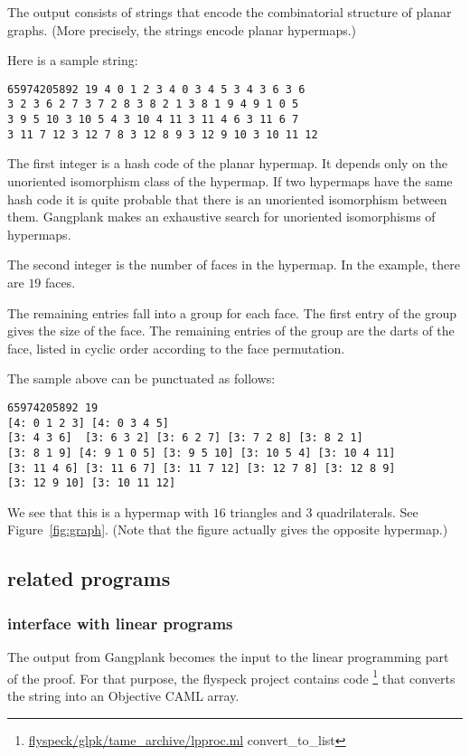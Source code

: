 The output consists of strings that encode the combinatorial structure of planar graphs.  (More precisely, the strings encode planar hypermaps.)

Here is a sample string:
\begin{verbatim}
65974205892 19 4 0 1 2 3 4 0 3 4 5 3 4 3 6 3 6 
3 2 3 6 2 7 3 7 2 8 3 8 2 1 3 8 1 9 4 9 1 0 5 
3 9 5 10 3 10 5 4 3 10 4 11 3 11 4 6 3 11 6 7 
3 11 7 12 3 12 7 8 3 12 8 9 3 12 9 10 3 10 11 12
\end{verbatim}

The first integer is a hash code of the planar hypermap.  It depends only on the
unoriented isomorphism class of the hypermap.  
If two hypermaps have the same hash code
it is quite probable that there is an unoriented isomorphism between them.
Gangplank 
makes an exhaustive search for unoriented isomorphisms of hypermaps.

The second integer is the number of faces in the hypermap.  In the example,
there are $19$ faces.

The remaining entries fall into a group for each face.  The first entry of the group
gives the size of the face.  The remaining entries of the group are the darts of
the face, listed in cyclic order according to the face permutation.

The sample above can be punctuated as follows:
\begin{verbatim}
65974205892 19 
[4: 0 1 2 3] [4: 0 3 4 5] 
[3: 4 3 6]  [3: 6 3 2] [3: 6 2 7] [3: 7 2 8] [3: 8 2 1] 
[3: 8 1 9] [4: 9 1 0 5] [3: 9 5 10] [3: 10 5 4] [3: 10 4 11] 
[3: 11 4 6] [3: 11 6 7] [3: 11 7 12] [3: 12 7 8] [3: 12 8 9] 
[3: 12 9 10] [3: 10 11 12]
\end{verbatim}
We see that this is a hypermap
with $16$ triangles and $3$ quadrilaterals.  See Figure~\ref{fig:graph}.
(Note that the figure actually gives the opposite hypermap.)




\subsection{related programs}


\subsubsection{interface with linear programs}

The output from Gangplank becomes the input to the linear programming
part of the proof.  For that purpose, the flyspeck project contains
code%
\footnote{\url{flyspeck/glpk/tame_archive/lpproc.ml}
  convert\_to\_list} %
that converts the string into an Objective CAML array.



